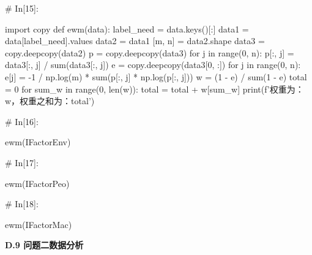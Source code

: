 \documentclass{MathorCupModeling}
\begin{document}
\begin{python}
# In[15]:


import copy
def ewm(data):
    label_need = data.keys()[:]
    data1 = data[label_need].values
    data2 = data1
    [m, n] = data2.shape
    data3 = copy.deepcopy(data2)
    p = copy.deepcopy(data3)
    for j in range(0, n):
        p[:, j] = data3[:, j] / sum(data3[:, j])
    e = copy.deepcopy(data3[0, :])
    for j in range(0, n):
        e[j] = -1 / np.log(m) * sum(p[:, j] * np.log(p[:, j]))
    w = (1 - e) / sum(1 - e)
    total = 0
    for sum_w in range(0, len(w)):
        total = total + w[sum_w]
    print(f'权重为：{w}，权重之和为：{total}')


# In[16]:


ewm(IFactorEnv)


# In[17]:


ewm(IFactorPeo)


# In[18]:


ewm(IFactorMac)


\end{python}
\newpage
\textbf{D.9 问题二数据分析}
\end{document}
